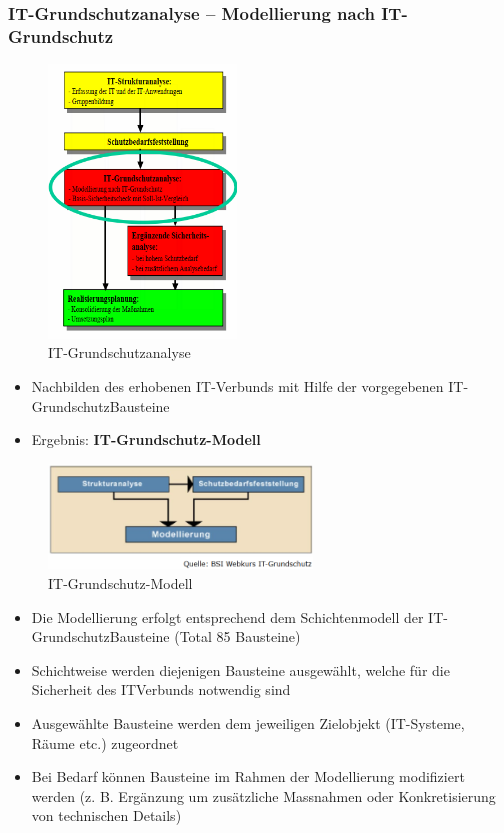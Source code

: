 \documentclass[10pt,a4paper]{article}
\begin{document}
\subsubsection*{IT-Grundschutzanalyse – Modellierung nach IT-Grundschutz}
\begin{figure}[H]
    \begin{center}
    \includegraphics[width=5cm]{images/IT-Grundschutzanalyse.png}
    \caption{IT-Grundschutzanalyse}
    \label{IT-Grundschutzanalyse}
    \end{center}
\end{figure}

\begin{itemize}[noitemsep,topsep=0pt,leftmargin=*]
    \item Nachbilden des erhobenen IT-Verbunds mit Hilfe der vorgegebenen IT-GrundschutzBausteine
    \item Ergebnis: \textbf{IT-Grundschutz-Modell}
\end{itemize}

\begin{figure}[H]
    \begin{center}
    \includegraphics[width=7cm]{images/IT-Grundschutz-Modell.png}
    \caption{IT-Grundschutz-Modell}
    \label{IT-Grundschutz-Modell}
    \end{center}
\end{figure}

\begin{itemize}[noitemsep,topsep=0pt,leftmargin=*]
    \item Die Modellierung erfolgt entsprechend dem Schichtenmodell der IT-GrundschutzBausteine (Total 85 Bausteine)
    \item Schichtweise werden diejenigen Bausteine ausgewählt, welche für die Sicherheit des ITVerbunds notwendig sind
    \item Ausgewählte Bausteine werden dem jeweiligen Zielobjekt (IT-Systeme, Räume etc.) zugeordnet
    \item Bei Bedarf können Bausteine im Rahmen der Modellierung modifiziert werden (z. B. Ergänzung um zusätzliche Massnahmen oder Konkretisierung von technischen Details)
\end{itemize}
\end{document}
